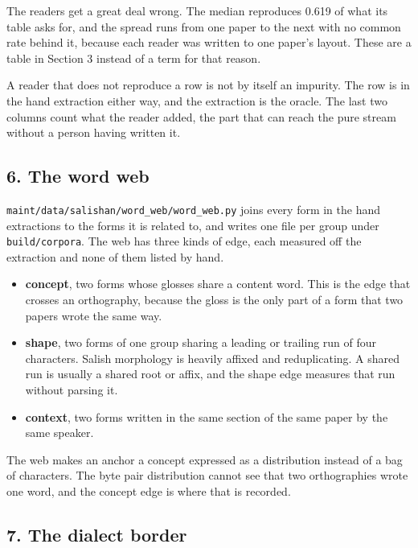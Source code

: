 The readers get a great deal wrong. The median reproduces 0.619 of what its table asks for, and the spread runs from one paper to the next with no common rate behind it, because each reader was written to one paper's layout. These are a table in Section 3 instead of a term for that reason.

A reader that does not reproduce a row is not by itself an impurity. The row is in the hand extraction either way, and the extraction is the oracle. The last two columns count what the reader added, the part that can reach the pure stream without a person having written it.

\subsection{6. The word web}

\texttt{maint/\allowbreak{}data/\allowbreak{}salishan/\allowbreak{}word\_\allowbreak{}web/\allowbreak{}word\_\allowbreak{}web.\allowbreak{}py} joins every form in the hand extractions to the forms it is related to, and writes one file per group under \texttt{build/\allowbreak{}corpora}. The web has three kinds of edge, each measured off the extraction and none of them listed by hand.

\begin{itemize}
\item \textbf{concept}, two forms whose glosses share a content word. This is the edge that crosses an orthography, because the gloss is the only part of a form that two papers wrote the same way.
\item \textbf{shape}, two forms of one group sharing a leading or trailing run of four characters. Salish morphology is heavily affixed and reduplicating. A shared run is usually a shared root or affix, and the shape edge measures that run without parsing it.
\item \textbf{context}, two forms written in the same section of the same paper by the same speaker.
\end{itemize}

The web makes an anchor a concept expressed as a distribution instead of a bag of characters. The byte pair distribution cannot see that two orthographies wrote one word, and the concept edge is where that is recorded.

\subsection{7. The dialect border}

